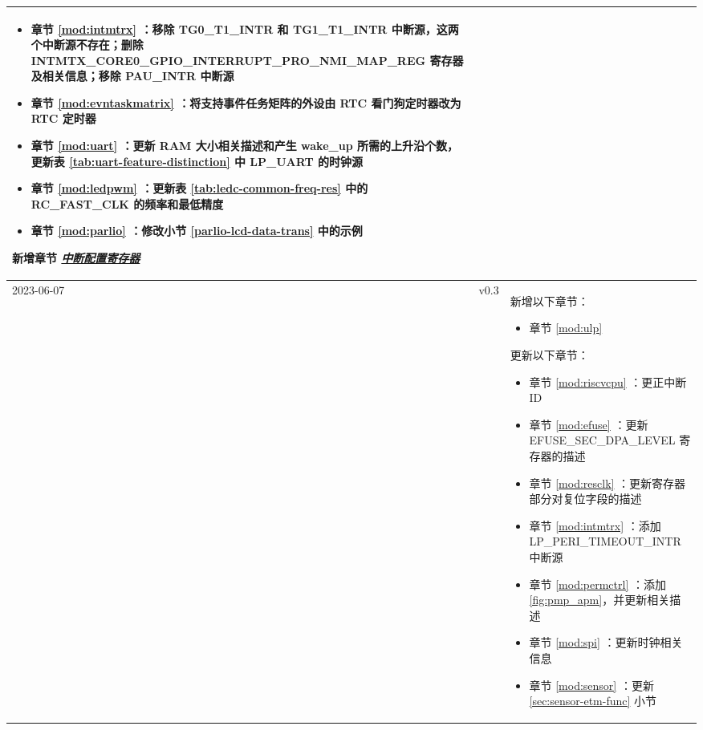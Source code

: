 \begin{longtable}[l]{ | m{2cm} | m{1.5cm} | m{12cm} | }
\begin{itemize}
        \item 章节 \ref{mod:intmtrx} \textit{\nameref{mod:intmtrx}}：移除 TG0\_T1\_INTR 和 TG1\_T1\_INTR 中断源，这两个中断源不存在；删除 INTMTX\_CORE0\_GPIO\_INTERRUPT\_PRO\_NMI\_MAP\_REG 寄存器及相关信息；移除 PAU\_INTR 中断源 %
        \item 章节 \ref{mod:evntaskmatrix} \textit{\nameref{mod:evntaskmatrix}}：将支持事件任务矩阵的外设由 RTC 看门狗定时器改为 RTC 定时器 %
        \item 章节 \ref{mod:uart} \textit{\nameref{mod:uart}}：更新 RAM 大小相关描述和产生 wake\_up 所需的上升沿个数，更新表 \ref{tab:uart-feature-distinction} 中 LP\_UART 的时钟源 %
        \item 章节 \ref{mod:ledpwm} \textit{\nameref{mod:ledpwm}}：更新表 \ref{tab:ledc-common-freq-res} 中的 RC\_FAST\_CLK 的频率和最低精度  %
        \item 章节 \ref{mod:parlio} \textit{\nameref{mod:parlio}}：修改小节 \ref{parlio-lcd-data-trans} \textit{\nameref{parlio-lcd-data-trans}} 中的示例
    \end{itemize}
    新增章节 \hyperref[interrupt-config-registers]{\textit{中断配置寄存器}}
    \\\hline
    2023-06-07        & v0.3 &
    新增以下章节：
    \begin{itemize}
        \item 章节 \ref{mod:ulp} \textit{\nameref{mod:ulp}}
    \end{itemize}
    更新以下章节：
    \begin{itemize}
        \item 章节 \ref{mod:riscvcpu} \textit{\nameref{mod:riscvcpu}}：更正中断 ID %
        \item 章节 \ref{mod:efuse} \textit{\nameref{mod:efuse}}：更新EFUSE\_SEC\_DPA\_LEVEL 寄存器的描述 %
        \item 章节 \ref{mod:resclk} \textit{\nameref{mod:resclk}}：更新寄存器部分对复位字段的描述 %
        \item 章节 \ref{mod:intmtrx} \textit{\nameref{mod:intmtrx}}：添加 LP\_PERI\_TIMEOUT\_INTR 中断源 %
        \item 章节 \ref{mod:permctrl} \textit{\nameref{mod:permctrl}}：添加 \ref{fig:pmp_apm}，并更新相关描述 %
        \item 章节 \ref{mod:spi} \textit{\nameref{mod:spi}}：更新时钟相关信息 %
        \item 章节 \ref{mod:sensor} \textit{\nameref{mod:sensor}}：更新 \ref{sec:sensor-etm-func} \textit{\nameref{sec:sensor-etm-func}} 小节

\end{itemize}
\end{longtable}
